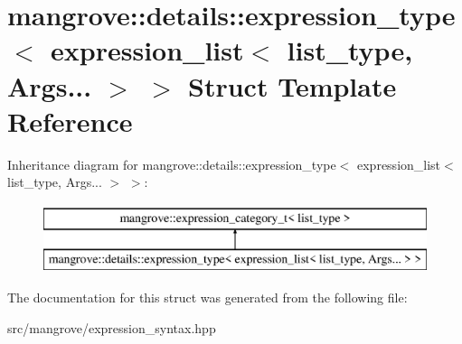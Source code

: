 \hypertarget{structmangrove_1_1details_1_1expression__type_3_01expression__list_3_01list__type_00_01Args_8_8_8_01_4_01_4}{}\section{mangrove\+:\+:details\+:\+:expression\+\_\+type$<$ expression\+\_\+list$<$ list\+\_\+type, Args... $>$ $>$ Struct Template Reference}
\label{structmangrove_1_1details_1_1expression__type_3_01expression__list_3_01list__type_00_01Args_8_8_8_01_4_01_4}
Inheritance diagram for mangrove\+:\+:details\+:\+:expression\+\_\+type$<$ expression\+\_\+list$<$ list\+\_\+type, Args... $>$ $>$\+:\begin{figure}[H]
\begin{center}
\leavevmode
\includegraphics[height=2.000000cm]{structmangrove_1_1details_1_1expression__type_3_01expression__list_3_01list__type_00_01Args_8_8_8_01_4_01_4}
\end{center}
\end{figure}


The documentation for this struct was generated from the following file\+:\begin{DoxyCompactItemize}
\item 
src/mangrove/expression\+\_\+syntax.\+hpp\end{DoxyCompactItemize}
